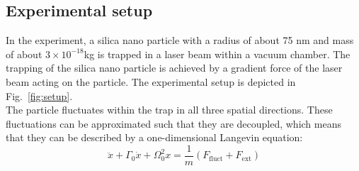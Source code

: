 \documentclass[12pt]{article}
\begin{document}
\subsection{Experimental setup}
In the experiment, a silica nano particle with a radius of about 75 nm and mass of about $3 \times 10^{-18}$kg is trapped in a laser beam within a
vacuum chamber. The trapping of the silica nano particle is achieved by a gradient force of the
laser beam acting on the particle. The experimental setup is depicted in Fig.~\ref{fig:setup}.\\
The particle fluctuates within the trap in all three spatial directions. These fluctuations can be approximated
such that they are decoupled, which means that they can be described by a one-dimensional Langevin equation:
\begin{equation}
    \label{eq:langevin}
    \ddot{x} + \Gamma_0 \dot{x} + \Omega^2_0x = \frac 1 m \left(F_\text{fluct} + F_\text{ext}\right)
\end{equation}
\end{document}
